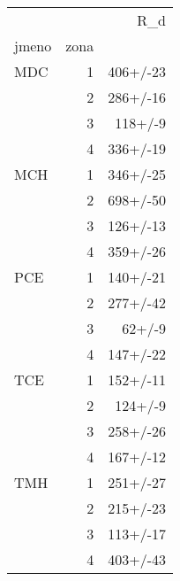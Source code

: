 \begin{tabular}{lrr}
\toprule
    &   &       R_d \\
jmeno & zona &           \\
\midrule
MDC & 1 &  406+/-23 \\
    & 2 &  286+/-16 \\
    & 3 &   118+/-9 \\
    & 4 &  336+/-19 \\
MCH & 1 &  346+/-25 \\
    & 2 &  698+/-50 \\
    & 3 &  126+/-13 \\
    & 4 &  359+/-26 \\
PCE & 1 &  140+/-21 \\
    & 2 &  277+/-42 \\
    & 3 &    62+/-9 \\
    & 4 &  147+/-22 \\
TCE & 1 &  152+/-11 \\
    & 2 &   124+/-9 \\
    & 3 &  258+/-26 \\
    & 4 &  167+/-12 \\
TMH & 1 &  251+/-27 \\
    & 2 &  215+/-23 \\
    & 3 &  113+/-17 \\
    & 4 &  403+/-43 \\
\bottomrule
\end{tabular}
